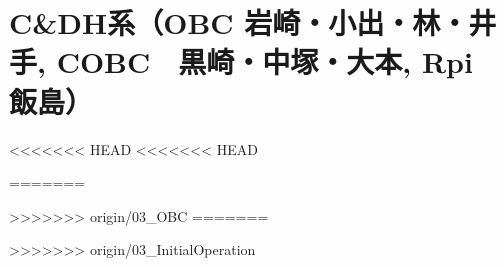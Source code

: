 \section{C\&DH系（OBC 岩崎・小出・林・井手, COBC　黒崎・中塚・大本, Rpi　飯島）}
<<<<<<< HEAD
<<<<<<< HEAD

=======

>>>>>>> origin/03_OBC
=======

>>>>>>> origin/03_InitialOperation
